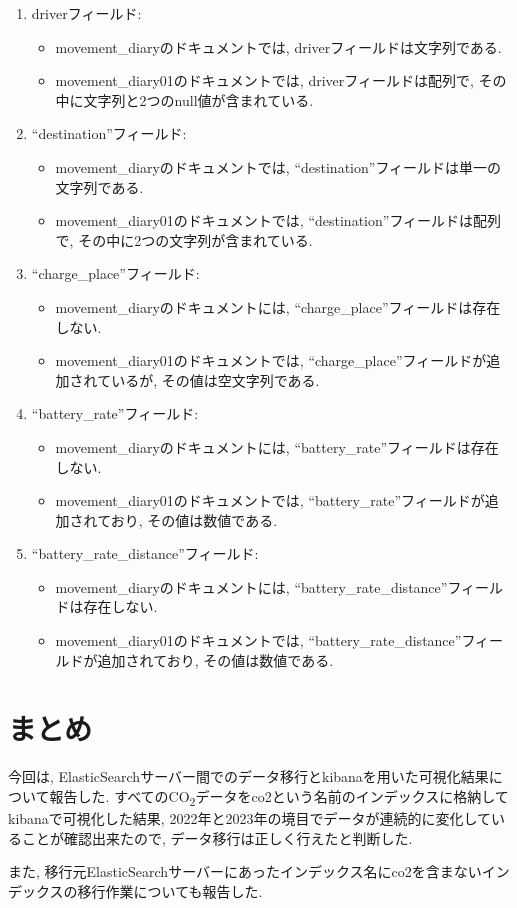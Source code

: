 \documentclass[a4j,12pt,]{jarticle}
\begin{document}
\begin{enumerate}
\item driverフィールド: 
\begin{itemize}
\item movement\_diaryのドキュメントでは, driverフィールドは文字列である.
\item movement\_diary01のドキュメントでは, driverフィールドは配列で, その中に文字列と2つのnull値が含まれている.
\end{itemize}

\item ``destination''フィールド: 
\begin{itemize}
\item movement\_diaryのドキュメントでは, ``destination''フィールドは単一の文字列である.
\item movement\_diary01のドキュメントでは, ``destination''フィールドは配列で, その中に2つの文字列が含まれている.
\end{itemize}

\item ``charge\_place''フィールド: 
\begin{itemize}
\item movement\_diaryのドキュメントには, ``charge\_place''フィールドは存在しない.
\item movement\_diary01のドキュメントでは, ``charge\_place''フィールドが追加されているが, その値は空文字列である.
\end{itemize}

\item ``battery\_rate''フィールド: 
\begin{itemize}
\item movement\_diaryのドキュメントには, ``battery\_rate''フィールドは存在しない.
\item movement\_diary01のドキュメントでは, ``battery\_rate''フィールドが追加されており, その値は数値である.
\end{itemize}

\item ``battery\_rate\_distance''フィールド: 
\begin{itemize}
\item movement\_diaryのドキュメントには, ``battery\_rate\_distance''フィールドは存在しない.
\item movement\_diary01のドキュメントでは, ``battery\_rate\_distance''フィールドが追加されており, その値は数値である.
\end{itemize}

\end{enumerate}

\section{まとめ}
今回は, ElasticSearchサーバー間でのデータ移行とkibanaを用いた可視化結果について報告した.
すべてのCO\textsubscript{2}データをco2という名前のインデックスに格納してkibanaで可視化した結果, 2022年と2023年の境目でデータが連続的に変化していることが確認出来たので, データ移行は正しく行えたと判断した.

  また, 移行元ElasticSearchサーバーにあったインデックス名にco2を含まないインデックスの移行作業についても報告した.
\end{document}
